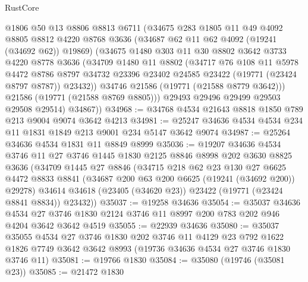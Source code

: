 \begin{lexlean}{RustCore}
\begin{coremodule}
          @1806
          @50
          @13
          @8806
          @8813
          @6711
          (@34675
            @283
            @1805
            @11
            @49
            @4092
            @8805
            @8812
            @4220
            @8768
            @3636
            (@34687 @62 @11 @62 @4092 (@19241 (@34692 @62)) @19869)
            (@34675
              @1480
              @303
              @11
              @30
              @8802
              @3642
              @3733
              @4220
              @8778
              @3636
              (@34709
                @1480
                @11
                @8802
                (@34717
                  @76
                  @108
                  @11
                  @5978
                  @4472
                  @8786
                  @8797
                  @34732
                  @23396
                  @23402
                  @24585
                  @23422
                  (@19771 (@23424 @8797 @8787))
                  @23432))
              @34746
              @21586
              (@19771 (@21588 @8779 @3642)))
            @21586
            (@19771 (@21588 @8769 @8805)))
          @29493
          @29496
          @29499
          @29503
          @29508
          @29514)
        @34867))
@34968 := @34768 @4534 @21643 @8818 @1850 @789 @213 @9004 @9074 @3642 @4213
@34981 := @25247 @34636 @4534 @4534 @234 @11 @1831 @1849 @213 @9001 @234 @5147 @3642 @9074
@34987 := @25264 @34636 @4534 @1831 @11 @8849 @8999
@35036 := @19207
    @34636
    @4534
    @3746
    @11
    @27
    @3746
    @1445
    @1830
    @2125
    @8846
    @8998
    @202
    @3630
    @8825
    @3636
    (@34709
      @1445
      @27
      @8846
      (@34715
        @218
        @62
        @23
        @130
        @27
        @6625
        @4472
        @8833
        @8841
        (@34687 @200 @63 @200 @6625 (@19241 (@34692 @200)) @29278)
        @34614
        @34618
        (@23405 (@34620 @23))
        @23422
        (@19771 (@23424 @8841 @8834))
        @23432))
@35037 := @19258 @34636
@35054 := @35037
    @34636
    @4534
    @27
    @3746
    @1830
    @2124
    @3746
    @11
    @8997
    @200
    @783
    @202
    @946
    @4204
    @3642
    @3642
    @4519
@35055 := @22939 @34636
@35080 := @35037
    @35055
    @4534
    @27
    @3746
    @1830
    @202
    @3746
    @11
    @4129
    @23
    @792
    @1622
    @1826
    @7749
    @3642
    @3642
    @8993
    (@19736 @34636 @4534 @27 @3746 @1830 @3746 @11)
@35081 := @19766 @1830
@35084 := @35080 (@19746 (@35081 @23))
@35085 := @21472 @1830

\end{coremodule}
\end{lexlean}
